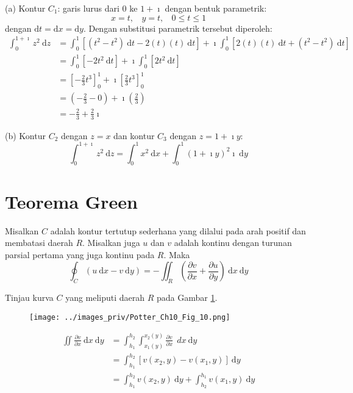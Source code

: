 (a) Kontur $C_{1}$: garis lurus dari $0$ ke $1+\imath$ dengan bentuk
parametrik:
\[
x=t,\ \ \ \ y=t,\ \ \ \ 0\leq t\leq1
\]
dengan $\mathrm{d}t=\mathrm{d}x=\mathrm{d}y$. Dengan substitusi parametrik
tersebut diperoleh:
\begin{align*}
\int_{0}^{1+\imath}z^{2}\ \mathrm{d}z & =\int_{0}^{1}\left[\left(t^{2}-t^{2}\right)\ \mathrm{d}t-2(t)(t)\ \mathrm{d}t\right]+\imath\int_{0}^{1}\left[2(t)(t)\ \mathrm{d}t+\left(t^{2}-t^{2}\right)\ \mathrm{d}t\right]\\
 & =\int_{0}^{1}\left[-2t^{2}\ \mathrm{d}t\right]+\imath\int_{0}^{1}\left[2t^{2}\ \mathrm{d}t\right]\\
 & =\left[-\frac{2}{3}t^{3}\right]_{0}^{1}+\imath\left[\frac{2}{3}t^{3}\right]_{0}^{1}\\
 & =\left(-\frac{2}{3}-0\right)+\imath\left(\frac{2}{3}\right)\\
 & =-\frac{2}{3}+\frac{2}{3}\imath
\end{align*}

(b) Kontur $C_{2}$ dengan $z=x$ dan kontur $C_{3}$ dengan $z=1+\imath y$:
\begin{equation*}
\int_{0}^{1+\imath}z^{2}\ \mathrm{d}z = \int_{0}^{1}x^{2}\ \mathrm{d}x +
\int_{0}^{1}\left(1 + \imath y\right)^{2} \imath\ \mathrm{d}y
\end{equation*}


\section{Teorema Green}

Misalkan $C$ adalah kontur tertutup sederhana yang dilalui pada arah
positif dan membatasi daerah $R$. Misalkan juga $u$ dan $v$ adalah
kontinu dengan turunan parsial pertama yang juga kontinu pada $R$.
Maka
\begin{equation*}
\oint_{C}\left(u\ \mathrm{d}x-v\ \mathrm{d}y\right) =
-\iint_{R}\left(\frac{\partial v}{\partial x} +
\frac{\partial u}{\partial y}\right)\ \mathrm{d}x\mathrm{\ d}y
\end{equation*}

Tinjau kurva $C$ yang meliputi daerah $R$ pada
Gambar \ref{fig:Potter_Ch10_Fig_10}.
\begin{figure}[h]
{\centering
\texttt{[image: ../images\_priv/Potter\_Ch10\_Fig\_10.png]}
\par}\label{fig:Potter_Ch10_Fig_10}
\end{figure}

\begin{align*}
\iint\frac{\partial v}{\partial x}\ \mathrm{d}x\mathrm{\ d}y & =\int_{h_{1}}^{h_{2}}\int_{x_{1}(y)}^{x_{2}(y)}\frac{\partial v}{\partial x}\ \ dx\mathrm{\ d}y\\
 & =\int_{h_{1}}^{h_{2}}\left[v(x_{2},y)-v(x_{1},y)\right]\ \mathrm{d}y\\
 & =\int_{h_{1}}^{h_{2}}v(x_{2},y)\ \mathrm{d}y+\int_{h_{2}}^{h_{1}}v(x_{1},y)\ \mathrm{d}y
\end{align*}

